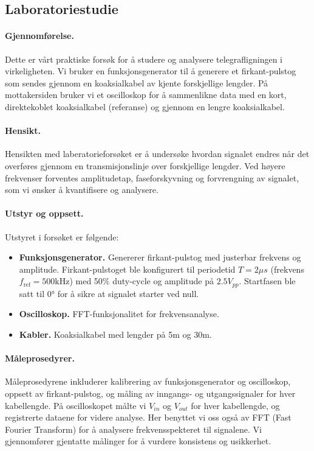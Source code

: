 \subsection{Laboratoriestudie}
\paragraph{Gjennomførelse.} Dette er vårt praktiske forsøk for å studere og analysere telegrafligningen i virkeligheten. Vi bruker en funksjonsgenerator til å generere et firkant-pulstog som sendes gjennom en koaksialkabel av kjente forskjellige lengder. På mottakersiden bruker vi et oscilloskop for å sammenlikne data med en kort, direktekoblet koaksialkabel (referanse) og gjennom en lengre koaksialkabel.

\paragraph{Hensikt.} Hensikten med laberatorieforsøket er å undersøke hvordan signalet endres når det overføres gjennom en transmisjonslinje over forskjellige lengder. Ved høyere frekvenser forventes amplitudetap, faseforskyvning og forvrengning av signalet, som vi ønsker å kvantifisere og analysere.

\paragraph{Utstyr og oppsett.}
Utstyret i forsøket er følgende:
\begin{itemize}
    \item \textbf{Funksjonsgenerator.} Genererer firkant-pulstog med justerbar frekvens og amplitude. Firkant-pulstoget ble konfigurert til periodetid $T = 2 \mu s$ (frekvens $f_\mathrm{ref} = 500 \mathrm{kHz}$) med 50\% duty-cycle og amplitude på $2.5V_{pp}$. Startfasen ble satt til $0\si{\degree}$ for å sikre at signalet starter ved null.
    \item \textbf{Oscilloskop.} FFT-funksjonalitet for frekvensanalyse.
    \item \textbf{Kabler.} Koaksialkabel med lengder på 5m og 30m.
\end{itemize}

\paragraph{Måleprosedyrer.}
Måleprosedyrene inkluderer kalibrering av funksjonsgenerator og oscilloskop, oppsett av firkant-pulstog, og måling av inngangs- og utgangssignaler for hver kabellengde. På oscilloskopet målte vi $V_{in}$ og $V_{out}$ for hver kabellengde, og registrerte dataene for videre analyse. Her benyttet vi oss også av FFT (Fast Fourier Transform) for å analysere frekvensspekteret til signalene. Vi gjennomfører gjentatte målinger for å vurdere konsistens og usikkerhet.

